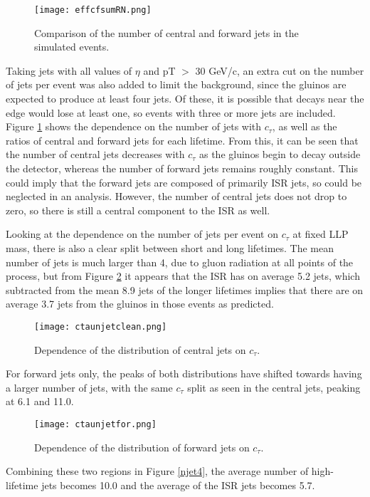 \documentclass{article}
\begin{document}
\begin{figure}[H]
\centering
\texttt{[image: effcfsumRN.png]}
\caption{Comparison of the number of central and forward jets in the simulated events.}
	\label{njet1}
\end{figure}

Taking jets with all values of $\eta$ and pT $>$ 30 GeV/c, an extra cut on the number of jets per event was also added to limit the background, since the gluinos are expected to produce at least four jets. Of these, it is possible that decays near the edge would lose at least one, so events with three or more jets are included. Figure \ref{njet1} shows the dependence on the number of jets with $c_{\tau}$, as well as the ratios of central and forward jets for each lifetime. From this, it can be seen that the number of central jets decreases with $c_{\tau}$ as the gluinos begin to decay outside the detector, whereas the number of forward jets remains roughly constant. This could imply that the forward jets are composed of primarily ISR jets, so could be neglected in an analysis. However, the number of central jets does not drop to zero, so there is still a central component to the ISR as well. 

Looking at the dependence on the number of jets per event on $c_{\tau}$ at fixed LLP mass, there is also a clear split between short and long lifetimes. The mean number of jets is much larger than 4, due to gluon radiation at all points of the process, but from Figure \ref{njet2} it appears that the ISR has on average 5.2 jets, which subtracted from the mean 8.9 jets of the longer lifetimes implies that there are on average 3.7 jets from the gluinos in those events as predicted. 

\begin{figure}[H]
\centering
\texttt{[image: ctaunjetclean.png]}
\caption{Dependence of the distribution of central jets on $c_{\tau}$.}
	\label{njet2}	
\end{figure}

For forward jets only, the peaks of both distributions have shifted towards having a larger number of jets, with the same $c_{\tau}$ split as seen in the central jets, peaking at 6.1 and 11.0. 

\begin{figure}[H]
\centering
\texttt{[image: ctaunjetfor.png]}
\caption{Dependence of the distribution of forward jets on $c_{\tau}$.}
\end{figure}

Combining these two regions in Figure \ref{njet4}, the average number of high-lifetime jets becomes 10.0 and the average of the ISR jets becomes 5.7. 
\end{document}
